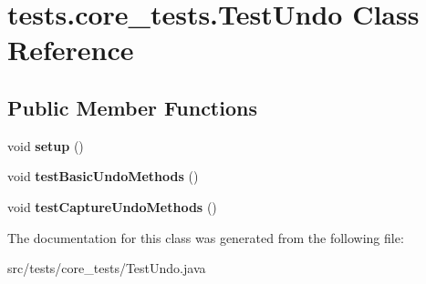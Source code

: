 \hypertarget{classtests_1_1core__tests_1_1_test_undo}{\section{tests.\-core\-\_\-tests.\-Test\-Undo Class Reference}
\label{classtests_1_1core__tests_1_1_test_undo}
}
\subsection*{Public Member Functions}
\begin{DoxyCompactItemize}
\item 
\hypertarget{classtests_1_1core__tests_1_1_test_undo_a12206580643377499c929d7d80a1d15a}{void {\bfseries setup} ()}\label{classtests_1_1core__tests_1_1_test_undo_a12206580643377499c929d7d80a1d15a}

\item 
\hypertarget{classtests_1_1core__tests_1_1_test_undo_aa8b1e68de7ca34af33adbbce703d6191}{void {\bfseries test\-Basic\-Undo\-Methods} ()}\label{classtests_1_1core__tests_1_1_test_undo_aa8b1e68de7ca34af33adbbce703d6191}

\item 
\hypertarget{classtests_1_1core__tests_1_1_test_undo_a279a9cab8ec841ef5f5b4d2ca6840bfa}{void {\bfseries test\-Capture\-Undo\-Methods} ()}\label{classtests_1_1core__tests_1_1_test_undo_a279a9cab8ec841ef5f5b4d2ca6840bfa}

\end{DoxyCompactItemize}


The documentation for this class was generated from the following file\-:\begin{DoxyCompactItemize}
\item 
src/tests/core\-\_\-tests/Test\-Undo.\-java\end{DoxyCompactItemize}
